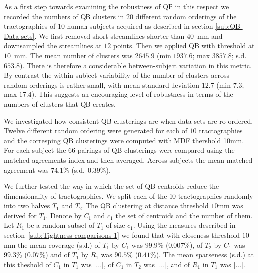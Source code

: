 \documentclass{bioinfo}
\begin{document}
As a first step towards examining the robustness of QB in this respect
we recorded the numbers of QB clusters in $20$ different random
orderings of the tractographies of $10$ human subjects acquired as
described in section \ref{sub:QB-Data-sets}. We first removed short
streamlines shorter than $40$~mm and downsampled the streamlines at $12$
points. Then we applied QB with threshold at $10$~mm. The mean number of
clusters was $2645.9$ (min $1937.6$; max $3857.8$; s.d.~$653.8$). There
is therefore a considerable between-subject variation in this metric. By
contrast the within-subject variability of the number of clusters across
random orderings is rather small, with mean standard deviation $12.7$
(min $7.3$; max $17.4$). This suggests an encouraging level of
robustness in terms of the numbers of clusters that QB creates.

We investigated how consistent QB clusterings are when data sets are
ro-ordered.  Twelve different random ordering were generated for each of
$10$ tractographies and the corresping QB clusterings were computed with
MDF thershold 10mm.  For each subject the $66$ pairings of QB
clusterings were compared using the matched agreements index and then
averaged. Across subjects the mean matched agreement was 74.1\% (s.d.~0.39\%).

We further tested the way in which the set of QB centroids reduce the
dimensionality of tractographies. We split each of the 10 tractographies
randomly into two halves $T_1$ and $T_2$.  The QB clustering at distance
threshold $10$mm was derived for $T_1$. Denote by $C_1$ and $c_1$ the
set of centroids and the number of them. Let $R_1$ be a random subset of
$T_1$ of size $c_1$. Using the measures described in
section~\ref{sub:Tightness-comparisons-1} we found that with closeness
threshold $10$mm the mean coverage (s.d.) of $T_1$ by $C_1$ was $99.9$\%
($0.007$\%), of $T_2$ by $C_1$ was $99.3$\% ($0.07$\%) and of $T_1$ by
$R_1$ was $90.5$\% ($0.41$\%). The mean sparseness (s.d.) at this
theshold of $C_1$ in $T_1$ was [...], of $C_1$ in $T_2$ was [...], and
of $R_1$ in $T_1$ was [...].


\end{document}
